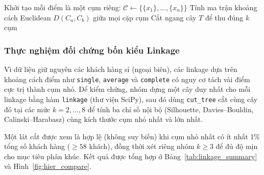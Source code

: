 \documentclass[12pt,a4paper]{article}
\numberwithin{equation}{section}
\numberwithin{table}{section}
\numberwithin{figure}{section}
\begin{document}
\begin{algorithm}[H]
\caption{Thuật toán Agglomerative Hierarchical Clustering}
\label{alg:hierarchical}
Khởi tạo mỗi điểm là một cụm riêng: $\mathcal{C} \leftarrow \{\{x_1\}, \ldots, \{x_n\}\}$\;
Tính ma trận khoảng cách Euclidean $D(C_a, C_b)$ giữa mọi cặp cụm\;
Cắt ngang cây $T$ để thu đúng $k$ cụm\;
\;
\end{algorithm}

\subsubsection{Thực nghiệm đối chứng bốn kiểu Linkage}

Vì dữ liệu giữ nguyên các khách hàng sỉ (ngoại biên), các linkage dựa trên khoảng cách điểm như \texttt{single}, \texttt{average} và \texttt{complete} có nguy cơ tách vài điểm cực trị thành cụm nhỏ. Để kiểm chứng, nhóm dựng một cây duy nhất cho mỗi linkage bằng hàm \texttt{linkage} (thư viện SciPy), sau đó dùng \texttt{cut\_tree} cắt cùng cây đó tại các mức $k = 2, \ldots, 8$ để tính ba chỉ số nội bộ (Silhouette, Davies--Bouldin, Calinski--Harabasz) cùng kích thước cụm nhỏ nhất và lớn nhất.

Một lát cắt được xem là hợp lệ (không suy biến) khi cụm nhỏ nhất có ít nhất 1\% tổng số khách hàng ($\ge 58$ khách), đồng thời xét riêng nhóm $k \ge 3$ để đủ độ mịn cho mục tiêu phân khúc. Kết quả được tổng hợp ở Bảng~\ref{tab:linkage_summary} và Hình~\ref{fig:hier_compare}.

\begin{table}[H]
\centering
\footnotesize
{}
\caption{Tổng hợp kiểm chứng bốn kiểu Linkage trên $5\,852$ khách hàng ($k = 2, \ldots, 8$).}
\label{tab:linkage_summary}
\end{table}
\end{document}
